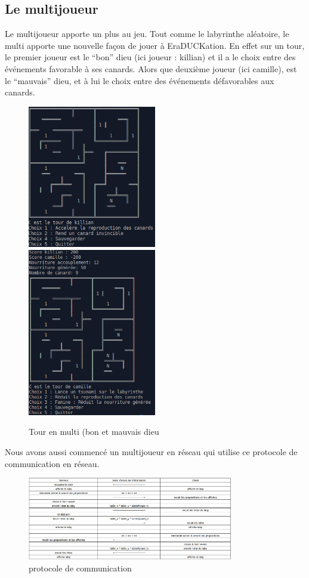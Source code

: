 \documentclass[12pt,a4paper,twoside]{article}
\begin{document}
\subsection{Le multijoueur}
Le multijoueur apporte un plus au jeu. Tout comme le labyrinthe aléatoire, le multi
apporte une nouvelle façon de jouer à EraDUCKation. En effet sur un tour, le premier joueur est le “bon” dieu (ici joueur : killian) et il a le choix entre des événements favorable à ses canards. Alors que deuxième joueur (ici camille), est le “mauvais” dieu, et à lui le choix entre des événements défavorables aux canards.
\begin{figure}[h]
\includegraphics[width=0.5\textwidth]{IMG/tour_kiki.png}
\includegraphics[width=0.5\textwidth]{IMG/tour_cam.png}
\caption{Tour en multi (bon et mauvais dieu}
\end{figure}
Nous avons aussi commencé un multijoueur en réseau qui utilise ce protocole de communication en réseau.
\begin{figure}[h]
\centering
\includegraphics[width=0.8\textwidth]{IMG/reseau.png}
\caption{protocole de communication}
\end{figure}
\newpage
\end{document}
